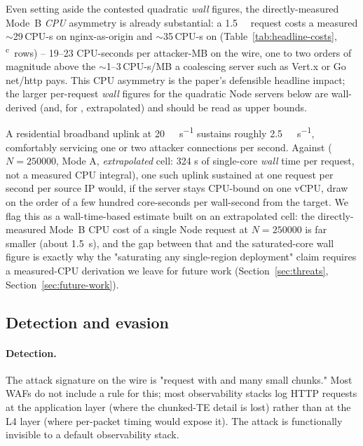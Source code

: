 Even setting aside the contested quadratic \emph{wall} figures,
the directly-measured Mode~B \emph{CPU} asymmetry is already
substantial: a \SI{1.5}{\mebi\byte} request costs a measured
$\sim$29\,CPU-s on nginx-as-origin and $\sim$35\,CPU-s on
 (Table~\ref{tab:headline-costs},
\textsuperscript{c}~rows) -- 19--23 CPU-seconds per attacker-MB
on the wire, one to two orders of magnitude above the
$\sim$1--3\,CPU-s/MB a coalescing server such as Vert.x or
Go net/http pays. This CPU asymmetry is the paper's defensible
headline impact; the larger per-request \emph{wall} figures for
the quadratic Node servers below are wall-derived (and, for
, extrapolated) and should be read as upper bounds.

A residential broadband uplink at \SI{20}{\mebi\bit\per\second}
sustains roughly \SI{2.5}{\mebi\byte\per\second}, comfortably
servicing one or two attacker connections per second. Against
 (\(N{=}\num{250000}\), Mode A, \emph{extrapolated}
cell: 324 s of single-core \emph{wall} time per request, not a
measured CPU integral), one such uplink sustained at one request
per second per source IP would, if the server stays CPU-bound on
one vCPU, draw on the order of a few hundred core-seconds per
wall-second from the target. We flag this as a wall-time-based
estimate built on an extrapolated cell: the directly-measured
Mode~B CPU cost of a single Node  request at
$N{=}\num{250000}$ is far smaller (about \SI{1.5}{\second}), and
the gap between that and the saturated-core wall figure is exactly
why the "saturating any single-region deployment" claim requires a
measured-CPU derivation we leave for future work
(Section~\ref{sec:threats}, Section~\ref{sec:future-work}).

\subsection{Detection and evasion}
\label{sec:tm-detect}

\paragraph{Detection.}
The attack signature on the wire is "request with
 and many small chunks." Most
WAFs do not include a rule for this; most observability stacks log
HTTP requests at the application layer (where the chunked-TE detail
is lost) rather than at the L4 layer (where per-packet timing
would expose it). The attack is functionally invisible to a
default observability stack.

